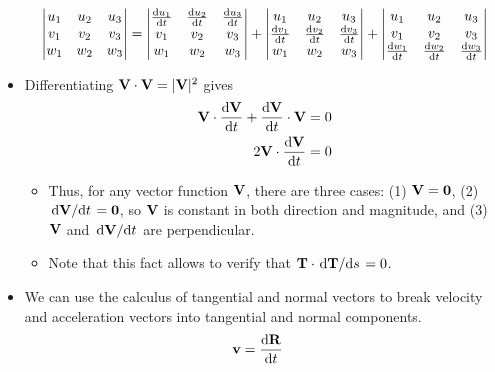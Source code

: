 \documentclass[../main.tex]{subfiles}
\begin{document}
\begin{itemize}
\begin{equation*}
\begin{vmatrix}
            u_1 & u_2 & u_3\\
            v_1 & v_2 & v_3\\
            w_1 & w_2 & w_3\\
        \end{vmatrix}
        =
        \begin{vmatrix}
            \dv{u_1}{t} & \dv{u_2}{t} & \dv{u_3}{t}\\
            v_1 & v_2 & v_3\\
            w_1 & w_2 & w_3\\
        \end{vmatrix}
        +
        \begin{vmatrix}
            u_1 & u_2 & u_3\\
            \dv{v_1}{t} & \dv{v_2}{t} & \dv{v_3}{t}\\
            w_1 & w_2 & w_3\\
        \end{vmatrix}
        +
        \begin{vmatrix}
            u_1 & u_2 & u_3\\
            v_1 & v_2 & v_3\\
            \dv{w_1}{t} & \dv{w_2}{t} & \dv{w_3}{t}\\
        \end{vmatrix}
    \end{equation*}
    \item Differentiating $\vb{V}\cdot\vb{V}=|\vb{V}|^2$ gives
    \begin{align*}
        \vb{V}\cdot\dv{\vb{V}}{t}+\dv{\vb{V}}{t}\cdot\vb{V} &= 0\\
        2\vb{V}\cdot\dv{\vb{V}}{t} &= 0
    \end{align*}
    \begin{itemize}
        \item Thus, for any vector function $\vb{V}$, there are three cases: (1) $\vb{V}=\vb{0}$, (2) $\dv*{\vb{V}}{t}=\vb{0}$, so $\vb{V}$ is constant in both direction and magnitude, and (3) $\vb{V}$ and $\dv*{\vb{V}}{t}$ are perpendicular.
        \item Note that this fact allows to verify that $\vb{T}\cdot\dv*{\vb{T}}{s}=0$.
    \end{itemize}
    \item We can use the calculus of tangential and normal vectors to break velocity and acceleration vectors into tangential and normal components.
    \begin{align*}
        \vb{v} &= \dv{\vb{R}}{t}&

\end{align*}
\end{itemize}
\end{document}
